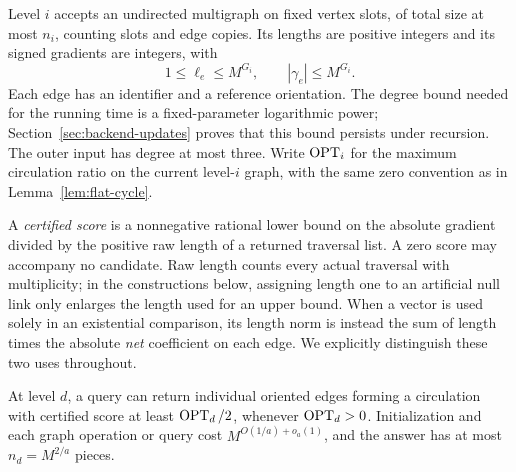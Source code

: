 Level $i$ accepts an undirected multigraph on fixed vertex slots, of total
size at most $n_i$, counting slots and edge copies.  Its lengths are
positive integers and its signed gradients are integers, with
\[
                   1\le\ell_e\le M^{G_i},\qquad
                   |\gamma_e|\le M^{G_i}.
\]
Each edge has an identifier and a reference orientation.  The degree
bound needed for the running time is a fixed-parameter logarithmic
power; Section~\ref{sec:backend-updates} proves that this bound persists
under recursion.  The outer input has degree at most three.
Write $\operatorname{OPT}_i$ for the maximum circulation ratio on the current
level-$i$ graph, with the same zero convention as in
Lemma~\ref{lem:flat-cycle}.

A \emph{certified score} is a nonnegative rational lower bound on the
absolute gradient divided by the positive raw length of a returned
traversal list.  A zero score may accompany no candidate.  Raw length
counts every actual traversal with multiplicity; in the constructions
below, assigning length one to an artificial null link only enlarges the
length used for an upper bound.  When a vector is used solely in an
existential comparison, its length norm is instead the sum of length
times the absolute \emph{net} coefficient on each edge.  We explicitly
distinguish these two uses throughout.

\begin{lemma}
\label{back:base}
At level $d$, a query can return individual oriented edges forming a
circulation with certified score at least $\operatorname{OPT}_d/2$, whenever
$\operatorname{OPT}_d>0$.  Initialization and each graph operation or query cost
$M^{O(1/a)+o_a(1)}$, and the answer has at most $n_d=M^{2/a}$ pieces.
\end{lemma}

